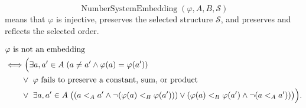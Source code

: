 \begin{remark*}
\[
\operatorname{NumberSystemEmbedding}(\varphi,A,B,\mathcal{S})
\]
means that $\varphi$ is injective, preserves the selected structure $\mathcal{S}$, and preserves and reflects the selected order.
\end{remark*}
\begin{remark*}
\[
\begin{aligned}
&\varphi \text{ is not an embedding}\\
&\Longleftrightarrow
\Bigl(\exists a,a'\in A\;(a\neq a'\land \varphi(a)=\varphi(a'))\\
&\qquad\lor\ \varphi \text{ fails to preserve a constant, sum, or product}\\
&\qquad\lor\ \exists a,a'\in A\;\bigl((a<_A a'\land \neg(\varphi(a)<_B\varphi(a')))
\lor(\varphi(a)<_B\varphi(a')\land \neg(a<_A a'))\bigr)\Bigr).
\end{aligned}
\]
\end{remark*}

